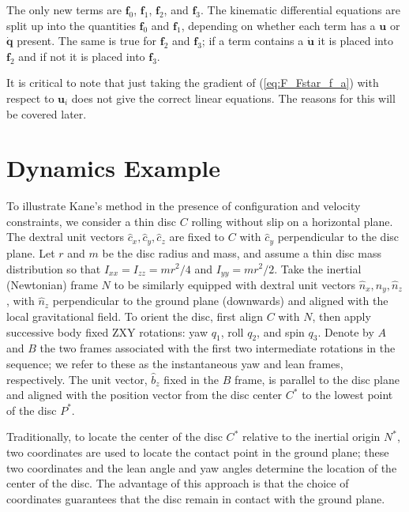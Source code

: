 \documentclass[smallcondensed,final]{svjour3}                     %
\begin{document}
The only new terms are $\mathbf{f}_0$, $\mathbf{f}_1$, $\mathbf{f}_2$, and
$\mathbf{f}_3$.
The kinematic differential equations are split up into the quantities
$\mathbf{f}_0$ and $\mathbf{f}_1$, depending on whether each term has a
$\mathbf{u}$ or $\dot{\mathbf{q}}$ present.
The same is true for $\mathbf{f}_2$ and $\mathbf{f}_3$; if a term contains a
$\dot{\mathbf{u}}$ it is placed into $\mathbf{f}_2$ and if not it is placed
into $\mathbf{f}_3$.

It is critical to note that just taking the gradient of (\ref{eq:F_Fstar_f_a})
with respect to $\mathbf{u}_i$ does not give the correct linear equations. The
reasons for this will be covered later.









\section{Dynamics Example}
To illustrate Kane's method in the presence of configuration and velocity
constraints, we consider a thin disc $C$ rolling without slip on a horizontal
plane. The dextral unit vectors $\hat{c}_x, \hat{c}_y, \hat{c}_z$ are fixed to $C$
with $\hat{c}_y$ perpendicular to the disc plane. Let $r$ and $m$ be the
disc radius and mass, and assume a thin disc mass distribution so that
$I_{xx}=I_{zz}=mr^2/4$ and $I_{yy} = mr^2/2$. Take the inertial (Newtonian)
frame $N$ to be similarly equipped with dextral unit vectors $\hat{n}_x,
\hat{n}_y, \hat{n}_z$, with $\hat{n}_z$ perpendicular to the ground plane
(downwards) and aligned with the local gravitational field. To orient the disc,
first align $C$ with $N$, then apply successive body fixed ZXY rotations:
yaw $q_1$, roll $q_2$, and spin $q_3$.  Denote by $A$ and $B$ the two frames
associated with the first two intermediate rotations in the sequence; we refer
to these as the instantaneous yaw and lean frames, respectively. The unit
vector, $\hat{b}_z$ fixed in the $B$ frame, is parallel to the disc plane and
aligned with the position vector from the disc center $C^*$ to the lowest point
of the disc $P^*$.

Traditionally, to locate the center of the disc $C^*$
relative to the inertial origin $N^*$, two coordinates are used to locate the
contact point in the ground plane; these two coordinates and the lean angle
and yaw angles determine the location of the center of the disc. The advantage of this
approach is that the choice of coordinates guarantees that the disc remain in
contact with the ground plane.
\end{document}
